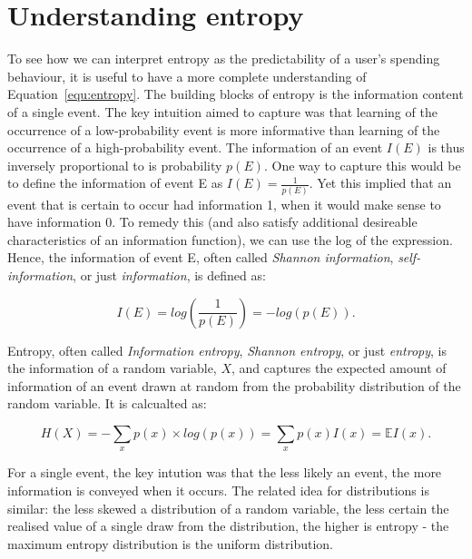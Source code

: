 
\section{Understanding entropy}%
\label{sec:understanding_entropy}

To see how we can interpret entropy as the predictability of a user's spending
behaviour, it is useful to have a more complete understanding of
Equation~\ref{equ:entropy}. The building blocks of entropy is the information
content of a single event.  The key intuition \citet{shannon1948mathematical}
aimed to capture was that learning of the occurrence of a low-probability event
is more informative than learning of the occurrence of a high-probability
event. The information of an event $I(E)$ is thus inversely proportional to is
probability $p(E)$. One way to capture this would be to define the information
of event E as $I(E) = \frac{1}{p(E)}$. Yet this implied that an event that is
certain to occur had information 1, when it would make sense to have
information 0. To remedy this (and also satisfy additional desireable
characteristics of an information function), we can use the log of the
expression. Hence, the information of event E, often called \textit{Shannon
information}, \textit{self-information}, or just \textit{information}, is
defined as:

\begin{equation}
    I(E) = log\left(\frac{1}{p(E)}\right) = -log(p(E)).
\end{equation}

Entropy, often called \textit{Information entropy}, \textit{Shannon entropy},
or just \textit{entropy}, is the information of a random variable, $X$, and
captures the expected amount of information of an event drawn at random from
the probability distribution of the random variable. It is calcualted as:

\begin{equation}
    H(X) = -\sum_x p(x) \times log(p(x)) = \sum_x p(x)I(x) = \mathbb{E} I(x).
\end{equation}

For a single event, the key intution was that the less likely an event, the
more information is conveyed when it occurs. The related idea for distributions
is similar: the less skewed a distribution of a random variable, the less
certain the realised value of a single draw from the distribution, the higher
is entropy - the maximum entropy distribution is the uniform distribution.


